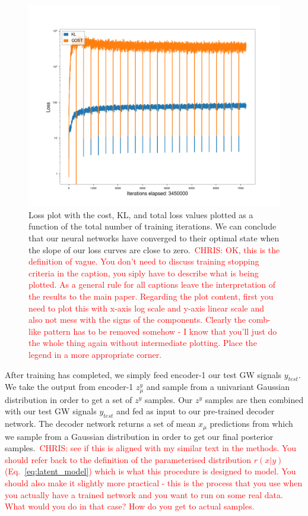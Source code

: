 \documentclass[%
showpacs,
 amsmath,amssymb,
 aps,
 twocolumn,
 prl,
 reprint,
floatfix,
]{revtex4-1}
\newcommand{\chris}[1]{\textcolor{red}{CHRIS: #1}}
\begin{document}
%
%
\begin{figure}
    \includegraphics[width=\columnwidth]{images/losses_logscale.png}
    \caption{\label{fig:loss_log} Loss plot with the cost, KL, and total loss
values plotted as a function of the total number of training iterations. We can
conclude that our neural networks have converged to their optimal state when
the slope of our loss curves are close to zero.~\chris{OK, this is the
definition of vague. You don't need to discuss training stopping criteria in
the caption, you siply have to describe what is being plotted. As a general
rule for all captions leave the interpretation of the results to the main
paper. Regarding the plot content, first you need to plot this with x-axis log
scale and y-axis linear scale and also not mess with the signs of the
components. Clearly the comb-like pattern has to be removed somehow - I know
that you'll just do the whole thing again without intermediate plotting. Place
the legend in a more appropriate corner.}} 
\end{figure}

%
%
After training has completed, we simply feed encoder-1 our test GW signals
$y_{test}$. We take the output from encoder-1 $z^{y}_{\mu}$ and sample from a
univariant Gaussian distribution in order to get a set of $z^{y}$ samples. Our
$z^{y}$ samples are then combined with our test GW signals $y_{test}$ and fed
as input to our pre-trained decoder network. The decoder network returns a set
of mean $x_{\mu}$ predictions from which we sample from a Gaussian distribution
in order to get our final posterior samples.~\chris{see if this is aligned with
my similar text in the methods. You should refer back to the definition of the
parameterised distribution $r(x|y)$ (Eq.~\ref{eq:latent_model}) which is what
this procedure is designed to model. You should also make it slightly more
practical - this is the process that you use when you actually have a trained
network and you want to run on some real data. What would you do in that case?
How do you get to actual samples.}
\end{document}
